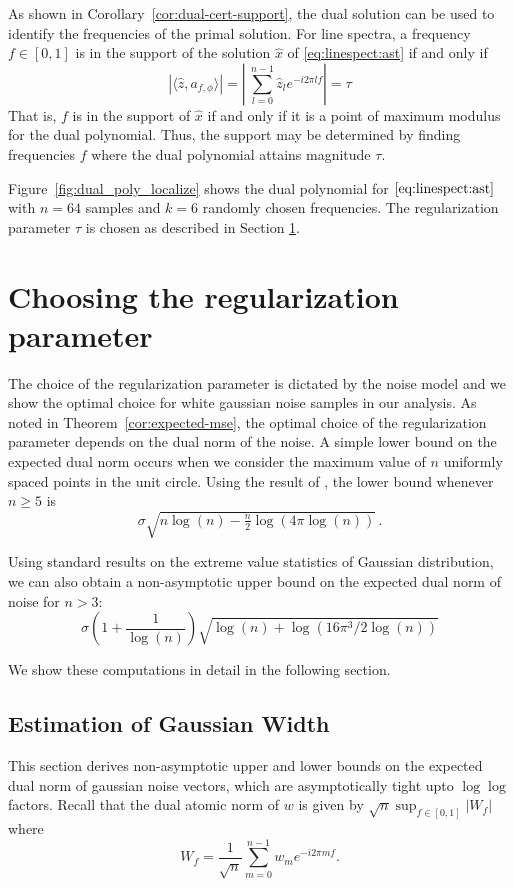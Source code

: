 As shown in Corollary~\ref{cor:dual-cert-support}, the dual solution can be
used to identify the frequencies of the primal solution. For line spectra, a frequency
$f \in [0,1]$ is in the support of the solution $\hat{x}$ of \eqref{eq:linespect:ast} if and
only if
\[
	 |\langle \hat{z}, a_{f,\phi} \rangle| =\left|\ \sum_{l=0}^{n-1} \hat{z}_l e^{-i 2\pi l f} \right| = \tau
\]
That is, $f$ is in the support of $\hat{x}$ if and only if it is a point of
maximum modulus for the dual polynomial. Thus, the support may be determined by
finding frequencies $f$ where the dual polynomial attains magnitude $\tau$.

Figure~\ref{fig:dual_poly_localize} shows the dual polynomial for
$\eqref{eq:linespect:ast}$ with $n = 64$ samples and $k = 6$ randomly chosen
frequencies. The regularization parameter $\tau$ is chosen as described in
Section \ref{subsec:parameter}.

\section{Choosing the regularization parameter}\label{subsec:parameter}
The choice of the regularization parameter is dictated by the noise model and
we show the optimal choice for white gaussian noise samples in our analysis. As
noted in Theorem~\ref{cor:expected-mse}, the optimal choice of the
regularization parameter depends on the dual norm of the noise.  A simple
lower bound on the expected dual norm occurs when we consider the maximum
value of $n$ uniformly spaced points in the unit circle. Using the result of
\cite{lr76}, the lower bound whenever $n \geq 5$ is
\[
\sigma\sqrt{n\log(n) - \tfrac{n}{2} \log(4\pi\log(n))}\,.
\]

Using standard results on the extreme value statistics of Gaussian distribution,
we can also obtain a non-asymptotic upper bound on the expected dual norm of
noise for $n > 3$:
\[\sigma\left(1  + \frac{1}{\log(n)}\right)\sqrt{\log(n) + \log(16 \pi^3/2 \log(n))}\nonumber
\]

We show these computations in detail in the following section.

\subsection{Estimation of Gaussian Width}
\label{proof:dual-norm-bounds}

This section derives non-asymptotic upper and lower bounds on the expected dual norm of gaussian noise vectors, which are asymptotically tight upto $\log\log$ factors. Recall that the dual atomic norm of $w$ is given by $\sqrt{n}\sup_{f \in [0,1]}|W_f|$ where
\begin{equation*}
\label{ranproc}
W_f = \frac{1}{\sqrt{n}}\sum_{m=0}^{n-1}{w_m e^{-i2 \pi m f}}.
\end{equation*}

